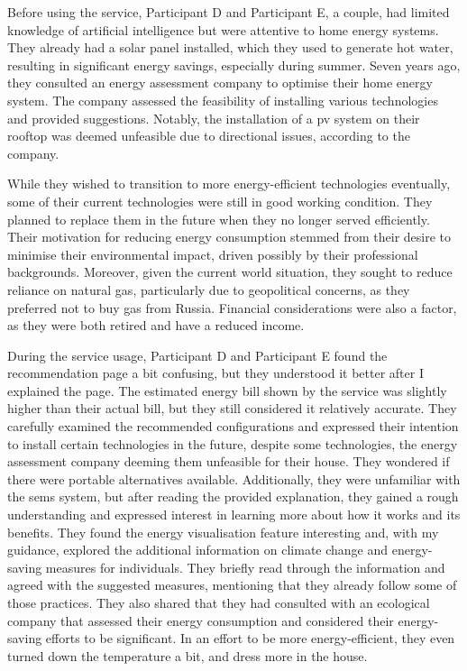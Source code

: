 Before using the service, 
Participant D and Participant E, a couple, 
had limited knowledge of artificial intelligence but were attentive to home energy systems. 
They already had a solar panel installed, which they used to generate hot water, resulting in significant energy savings, especially during summer. 
Seven years ago, they consulted an energy assessment company to optimise their home energy system. 
The company assessed the feasibility of installing various technologies and provided suggestions. 
Notably, the installation of a \gls{pv} system on their rooftop was deemed unfeasible due to directional issues, according to the company.

While they wished to transition to more energy-efficient technologies eventually, 
some of their current technologies were still in good working condition. 
They planned to replace them in the future when they no longer served efficiently. 
Their motivation for reducing energy consumption stemmed from their desire to minimise their environmental impact, 
driven possibly by their professional backgrounds. 
Moreover, given the current world situation, they sought to reduce reliance on natural gas, 
particularly due to geopolitical concerns, as they preferred not to buy gas from Russia. 
Financial considerations were also a factor, as they were both retired and have a reduced income.

During the service usage, 
Participant D and Participant E found the recommendation page a bit confusing, but they understood it better after I explained the page. 
The estimated energy bill shown by the service was slightly higher than their actual bill, but they still considered it relatively accurate. 
They carefully examined the recommended configurations and expressed their intention to install certain technologies in the future, 
despite some technologies, the energy assessment company deeming them unfeasible for their house. 
They wondered if there were portable alternatives available. 
Additionally, they were unfamiliar with the \gls{sems} system, but after reading the provided explanation, they gained a rough understanding and expressed interest in learning more about how it works and its benefits.
They found the energy visualisation feature interesting and, with my guidance, explored the additional information on climate change and energy-saving measures for individuals.
They briefly read through the information and agreed with the suggested measures, mentioning that they already follow some of those practices. 
They also shared that they had consulted with an ecological company that assessed their energy consumption and considered their energy-saving efforts to be significant. 
In an effort to be more energy-efficient, they even turned down the temperature a bit, and dress more in the house. 

